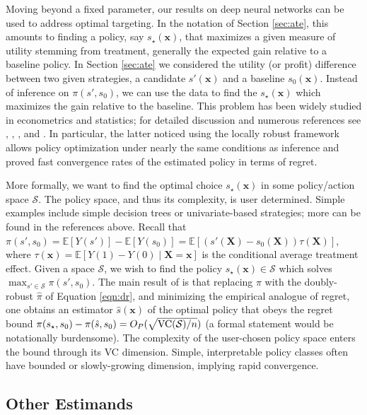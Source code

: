 \documentclass[11pt]{article}
\numberwithin{equation}{section}
\theoremstyle{definition}
\newcommand{\E}{\mathbb{E}}
\newcommand{\bx}{\bm{x}}
\newcommand{\bX}{\bm{X}}
\begin{document}
Moving beyond a fixed parameter, our results on deep neural networks can be used to address optimal targeting. In the notation of Section \ref{sec:ate}, this amounts to finding a policy, say $s_\star(\bx)$, that maximizes a given measure of utility stemming from treatment, generally the expected gain relative to a baseline policy. In Section \ref{sec:ate} we considered the utility (or profit) difference between two given strategies, a candidate $s'(\bx)$ and a baseline $s_0(\bx)$. Instead of inference on $\pi(s', s_0)$, we can use the data to find the $s_\star(\bx)$ which maximizes the gain relative to the baseline. This problem has been widely studied in econometrics and statistics; for detailed discussion and numerous references see \cite{Manski2004_Ecma}, \cite{Hirano-Porter2009_Ecma}, \cite{Kitagawa-Tetenov2018_Ecma}, and \cite{Athey-Wager2018_WP}. In particular, the latter noticed using the locally robust framework allows policy optimization under nearly the same conditions as inference and proved fast convergence rates of the estimated policy in terms of regret. 


More formally, we want to find the optimal choice $s_\star(\bx)$ in some policy/action space $\mathcal{S}$. The policy space, and thus its complexity, is user determined. Simple examples include simple decision trees or univariate-based strategies; more can be found in the references above. Recall that $\pi(s', s_0) = \E[Y(s')] - \E[Y(s_0)] = \E [(s'(\bX) - s_0(\bX)) \tau(\bX)]$, where $\tau(\bx) = \E[Y(1) -  Y(0) \mid \bX = \bx]$ is the conditional average treatment effect. Given a space $\mathcal{S}$, we wish to find the policy $s_\star(\bx) \in \mathcal{S}$ which solves $\max_{s' \in \mathcal{S}} \pi(s', s_0)$. The main result of \cite{Athey-Wager2018_WP} is that replacing $\pi$ with the doubly-robust $\hat{\pi}$ of Equation \eqref{eqn:dr}, and minimizing the empirical analogue of regret, one obtains an estimator $\hat{s}(\bx)$ of the optimal policy that obeys the regret bound $\pi(s_\star, s_0) - \pi(\hat{s}, s_0) = O_P(\sqrt{{\rm VC}(\mathcal{S})/n})$ (a formal statement would be notationally burdensome). The complexity of the user-chosen policy space enters the bound through its VC dimension. Simple, interpretable policy classes often have bounded or slowly-growing dimension, implying rapid convergence. 






\subsection{Other Estimands}
	\label{sec:other params}
	
\end{document}
